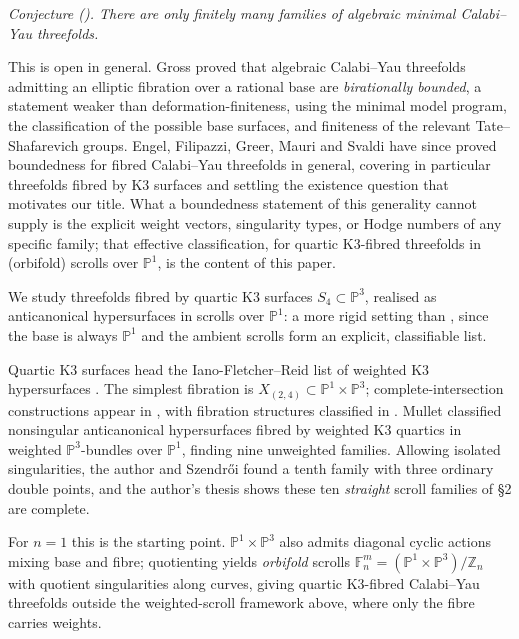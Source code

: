\documentclass[11pt]{article}
\newcommand{\PP}{\mathbb{P}}
\newcommand{\ZZ}{\mathbb{Z}}
\begin{document}
	
	\emph{Conjecture (\cite{Gross1994}). There are only finitely many families of algebraic minimal Calabi--Yau threefolds.}
	
	
	This is open in general. Gross \cite{Gross1994} proved that algebraic Calabi--Yau threefolds admitting an elliptic fibration over a rational base are \emph{birationally bounded}, a statement weaker than deformation-finiteness, using the minimal model program, the classification of the possible base surfaces, and finiteness of the relevant Tate--Shafarevich groups. Engel, Filipazzi, Greer, Mauri and Svaldi \cite{EngelFilipazziGreerMauriSvaldi2025} have since proved boundedness for fibred Calabi--Yau threefolds in general, covering in particular threefolds fibred by K3 surfaces and settling the existence question that motivates our title. What a boundedness statement of this generality cannot supply is the explicit weight vectors, singularity types, or Hodge numbers of any specific family; that effective classification, for quartic K3-fibred threefolds in (orbifold) scrolls over $\PP^1$, is the content of this paper.
	
	We study threefolds fibred by quartic K3 surfaces $S_4\subset\PP^3$, realised as anticanonical hypersurfaces in scrolls over $\PP^1$: a more rigid setting than \cite{Gross1994,EngelFilipazziGreerMauriSvaldi2025}, since the base is always $\PP^1$ and the ambient scrolls form an explicit, classifiable list.
	
	Quartic K3 surfaces head the Iano-Fletcher--Reid list of weighted K3 hypersurfaces \cite{IanoFletcher2000}. The simplest fibration is $X_{(2,4)}\subset\PP^1\times\PP^3$; complete-intersection constructions appear in \cite{CandelasDale1988,HeCandelas1990}, with fibration structures classified in \cite{Lara2017}. Mullet \cite{Mullet2009} classified nonsingular anticanonical hypersurfaces fibred by weighted K3 quartics in weighted $\PP^3$-bundles over $\PP^1$, finding nine unweighted families. Allowing isolated singularities, the author and Szendr\H{o}i \cite{MboyaSzendroi2023} found a tenth family with three ordinary double points, and the author's thesis \cite{Mboya2022} shows these ten \emph{straight} scroll families of \S2 are complete.
	
	For $n=1$ this is the starting point. $\PP^1\times\PP^3$ also admits diagonal cyclic actions mixing base and fibre; quotienting yields \emph{orbifold} scrolls $\mathbb{F}^m_n=(\PP^1\times\PP^3)/\ZZ_n$ with quotient singularities along curves, giving quartic K3-fibred Calabi--Yau threefolds outside the weighted-scroll framework above, where only the fibre carries weights.
	
\end{document}
